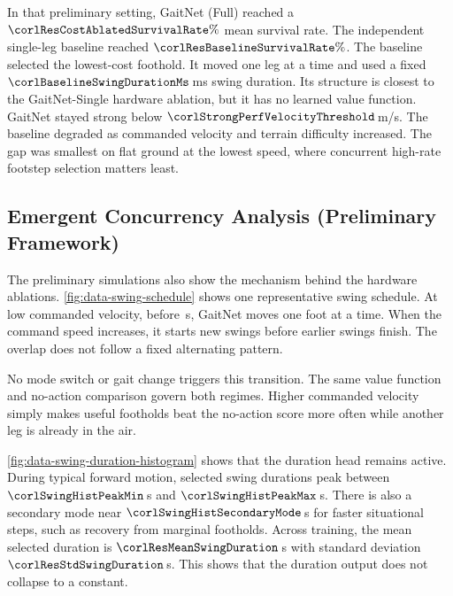 In that preliminary setting, GaitNet (Full) reached a
$\corlResCostAblatedSurvivalRate\%$ mean survival rate. The
independent single-leg baseline reached
$\corlResBaselineSurvivalRate\%$. The baseline selected the lowest-cost
foothold. It moved one leg at a time and used a fixed
$\corlBaselineSwingDurationMs$\,ms swing duration. Its structure is
closest to the GaitNet-Single hardware ablation, but it has no learned
value function. GaitNet stayed strong below
$\corlStrongPerfVelocityThreshold$\,m/s. The baseline degraded as
commanded velocity and terrain difficulty increased. The gap was
smallest on flat ground at the lowest speed, where concurrent
high-rate footstep selection matters least.

\subsection{Emergent Concurrency Analysis (Preliminary Framework)}
\label{subsec:results-concurrency}

The preliminary simulations also show the mechanism behind the
hardware ablations. \autoref{fig:data-swing-schedule} shows one
representative swing schedule. At low commanded velocity, before
\corlSwingScheduleTransitionMark\,s, GaitNet moves one foot at a time.
When the command speed increases, it starts new swings before earlier
swings finish. The overlap does not follow a fixed alternating
pattern.

No mode switch or gait change triggers this transition. The same value
function and no-action comparison govern both regimes. Higher
commanded velocity simply makes useful footholds beat the no-action
score more often while another leg is already in the air.

\autoref{fig:data-swing-duration-histogram} shows that the duration
head remains active. During typical forward motion, selected swing
durations peak between $\corlSwingHistPeakMin$\,s and
$\corlSwingHistPeakMax$\,s. There is also a secondary mode near
$\corlSwingHistSecondaryMode$\,s for faster situational steps, such as
recovery from marginal footholds. Across training, the mean selected
duration is $\corlResMeanSwingDuration$\,s with standard deviation
$\corlResStdSwingDuration$\,s. This shows that the duration output
does not collapse to a constant.

